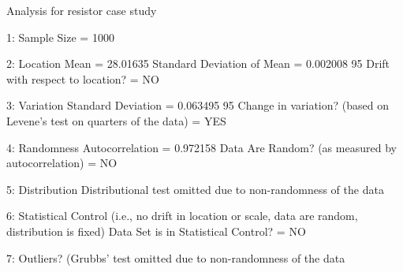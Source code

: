   
  
 Analysis for resistor case study
  
 1: Sample Size                           = 1000
  
 2: Location
    Mean                                  = 28.01635
    Standard Deviation of Mean            = 0.002008
    95%
    Drift with respect to location?       = NO
  
 3: Variation
    Standard Deviation                    = 0.063495
    95%
    Change in variation?
    (based on Levene's test on quarters
    of the data)                          = YES
  
 4: Randomness
    Autocorrelation                       = 0.972158
    Data Are Random?
      (as measured by autocorrelation)    = NO
  
 5: Distribution
    Distributional test omitted due to
    non-randomness of the data
  
 6: Statistical Control
    (i.e., no drift in location or scale,
    data are random, distribution is 
    fixed)
    Data Set is in Statistical Control?   = NO
  
 7: Outliers?
    (Grubbs' test omitted due to
    non-randomness of the data
  
